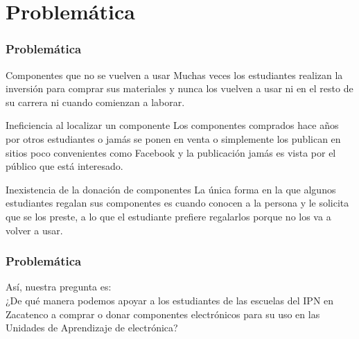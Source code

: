 \documentclass{beamer}
\begin{document}

\section{Problemática}

\begin{frame}
\frametitle{Problemática}
\begin{block}{Componentes que no se vuelven a usar}
Muchas veces los estudiantes realizan la inversión para comprar sus materiales y nunca los vuelven a usar ni en el resto de su carrera ni cuando comienzan a laborar.
\end{block}

\begin{block}{Ineficiencia al localizar un componente}
Los componentes comprados hace años por otros estudiantes o jamás se ponen en venta o simplemente los publican en sitios poco convenientes como Facebook y la publicación jamás es vista por el público que está interesado.
\end{block}

\begin{block}{Inexistencia de la donación de componentes}
La única forma en la que algunos estudiantes regalan sus componentes es cuando conocen a la persona y le solicita que se los preste, a lo que el estudiante prefiere regalarlos porque no los va a volver a usar.
\end{block}
\end{frame}

\begin{frame}
\frametitle{Problemática}
Así, nuestra pregunta es: \\

¿De qué manera podemos apoyar a los estudiantes de las escuelas del IPN en Zacatenco a comprar o donar componentes electrónicos para su uso en las Unidades de Aprendizaje de electrónica?
\end{frame}



\end{document}
